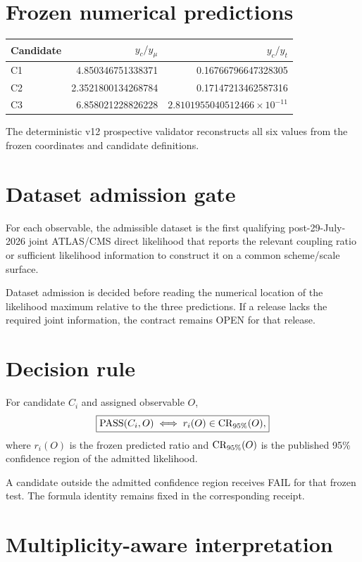 \section{Frozen numerical predictions}

\begin{center}
\begin{tabular}{lrr}
\toprule
Candidate & \(y_c/y_\mu\) & \(y_c/y_t\)\\
\midrule
C1 & 4.850346751338371 & 0.16766796647328305\\
C2 & 2.3521800134268784 & 0.17147213462587316\\
C3 & 6.858021228826228 & \(2.8101955040512466\times10^{-11}\)\\
\bottomrule
\end{tabular}
\end{center}

The deterministic v12 prospective validator reconstructs all six values from
the frozen coordinates and candidate definitions.

\section{Dataset admission gate}

For each observable, the admissible dataset is the first qualifying
post-29-July-2026 joint ATLAS/CMS direct likelihood that reports the relevant
coupling ratio or sufficient likelihood information to construct it on a common
scheme/scale surface.

Dataset admission is decided before reading the numerical location of the
likelihood maximum relative to the three predictions.  If a release lacks the
required joint information, the contract remains OPEN for that release.

\section{Decision rule}

For candidate \(C_i\) and assigned observable \(O\),
\[
\boxed{
\operatorname{PASS}(C_i,O)
\iff
r_i(O)\in{\rm CR}_{95\%}(O),
}
\]
where \(r_i(O)\) is the frozen predicted ratio and
\({\rm CR}_{95\%}(O)\) is the published 95\% confidence region of the admitted
likelihood.

A candidate outside the admitted confidence region receives FAIL for that
frozen test.  The formula identity remains fixed in the corresponding receipt.

\section{Multiplicity-aware interpretation}

